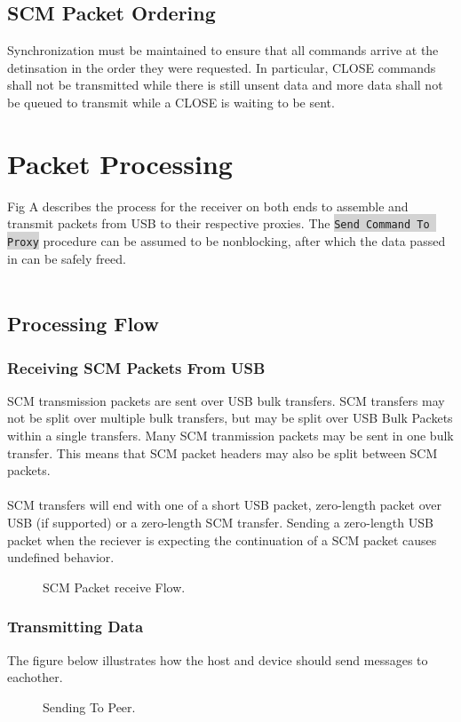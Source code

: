 \documentclass[10pt]{article}
\begin{document}
	\subsection{SCM Packet Ordering}
	Synchronization must be maintained to ensure that all commands arrive at the detinsation in the order they were requested. In particular, CLOSE commands shall not be transmitted while there is still unsent data and more data shall not be queued to transmit while a CLOSE is waiting to be sent. 
	
	\section{Packet Processing}
	Fig A describes the process for the receiver on both ends to assemble and transmit packets from USB to their respective proxies. The \colorbox{lightgray}{\lstinline{Send Command To Proxy}} procedure can be assumed to be nonblocking, after which the data passed in can be safely freed. \\
	\\	
	\subsection{Processing Flow}
	\subsubsection{Receiving SCM Packets From USB}
	SCM transmission packets are sent over USB bulk transfers. SCM transfers may not be split over multiple bulk transfers, but may be split over USB Bulk Packets within a single transfers. Many SCM tranmission packets may be sent in one bulk transfer. This means that SCM packet headers may also be split between SCM packets. \\
	\\
	SCM transfers will end with one of a short USB packet, zero-length packet over USB (if supported) or a zero-length SCM transfer. Sending a zero-length USB packet when the reciever is expecting the continuation of a SCM packet causes undefined behavior. 
	\begin{figure}[H]
	\begin{center}
		\caption[SCM Packet receive Flow.]{SCM Packet receive Flow.}
		 \resizebox{\linewidth}{!}{}
	\end{center}
	\end{figure}

	\subsubsection{Transmitting Data}
	The figure below illustrates how the host and device should send messages to eachother. 
	\begin{figure}[H]
	\begin{center}
		\caption[Sending To Peer]{Sending To Peer.}
		\resizebox{\linewidth}{!}{}
	\end{center}
	\end{figure}
\end{document}
